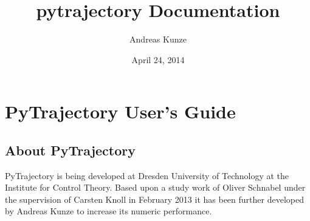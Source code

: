 \documentclass[letterpaper,10pt,english]{sphinxmanual}
\title{pytrajectory Documentation}
\date{April 24, 2014}
\author{Andreas Kunze}
\begin{document}
\maketitle
\tableofcontents
{}\label{index::doc}



\chapter{PyTrajectory User's Guide}
\label{guide/index:pytrajectory-user-s-guide}\label{guide/index:welcome-to-pytrajectory-s-documentation}\label{guide/index::doc}

\section{About PyTrajectory}
\label{guide/about:about-pytrajectory}\label{guide/about::doc}
PyTrajectory is being developed at Dresden University of Technology at the Institute for Control Theory.
Based upon a study work of Oliver Schnabel under the supervision of Carsten Knoll in February 2013
it has been further developed by Andreas Kunze to increase its numeric performance.
\end{document}
